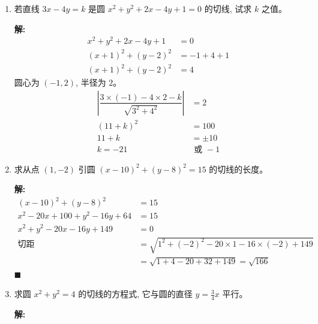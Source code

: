 \documentclass[10pt]{article}
\newcommand{\sol}{\textbf{解:} }
\begin{document}
\begin{enumerate}[leftmargin=*]
  \item 若直线 $3 x-4 y=k$ 是圆 $x^{2}+y^{2}+2 x-4 y+1=0$ 的切线, 试求 $k$ 之值。

        \sol{}
        \begin{align*}
          x^{2}+y^{2}+2 x-4 y+1 & = 0          \\
          (x+1)^{2}+(y-2)^{2}   & = -1 + 4 + 1 \\
          (x+1)^{2}+(y-2)^{2}   & = 4
        \end{align*}
        圆心为 $(-1, 2)$, 半径为 $2$。
        \begin{align*}
          \left\vert \dfrac{3 \times (-1) - 4 \times 2 - k}{\sqrt{3^{2} + 4^{2}}} \right\vert & = 2           \\
          (11 + k)^2                                                                          & = 100         \\
          11 + k                                                                              & = \pm 10      \\
          k = -21                                                                             & \text{ 或 } -1
        \end{align*}

        \newpage
  \item 求从点 $(1,-2)$ 引圆 $(x-10)^{2}+(y-8)^{2}=15$ 的切线的长度。

        \sol{}
        \begin{align*}
          (x-10)^{2}+(y-8)^{2}       & = 15                                                           \\
          x^{2}-20x+100+y^{2}-16y+64 & = 15                                                           \\
          x^{2}+y^{2}-20x-16y+149    & = 0                                                            \\
          \text{切距}                  & = \sqrt{1^{2} + (-2)^{2} - 20 \times 1 - 16 \times (-2) + 149} \\
                                     & = \sqrt{1 + 4 - 20 + 32 + 149} = \sqrt{166}
        \end{align*} \hfill$\blacksquare$

  \item 求圆 $x^{2}+y^{2}=4$ 的切线的方程式, 它与圆的直径 $y=\frac{3}{4} x$ 平行。

        \sol{}


\end{enumerate}
\end{document}
